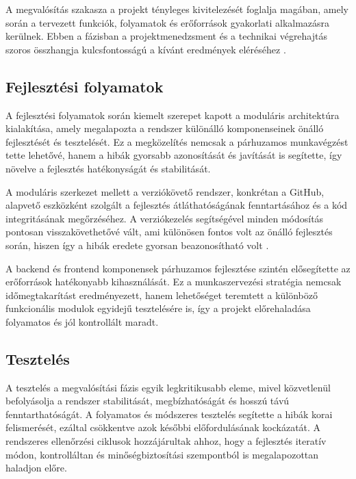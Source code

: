 A megvalósítás szakasza a projekt tényleges kivitelezését foglalja magában, amely során a tervezett funkciók, 
folyamatok és erőforrások gyakorlati alkalmazásra kerülnek. Ebben a fázisban a projektmenedzsment 
és a technikai végrehajtás szoros összhangja kulcsfontosságú a kívánt eredmények eléréséhez \cite{Hajdu2014,Szalay2018,Kaposi2019}.

\subsection{Fejlesztési folyamatok}

A fejlesztési folyamatok során kiemelt szerepet kapott a moduláris architektúra kialakítása, amely megalapozta a rendszer különálló komponenseinek önálló fejlesztését és tesztelését.  
Ez a megközelítés nemcsak a párhuzamos munkavégzést tette lehetővé, hanem a hibák gyorsabb azonosítását és javítását is segítette, így növelve a fejlesztés hatékonyságát és stabilitását.  

A moduláris szerkezet mellett a verziókövető rendszer, konkrétan a GitHub, alapvető eszközként szolgált a fejlesztés átláthatóságának 
fenntartásához és a kód integritásának megőrzéséhez.  
A verziókezelés segítségével minden módosítás pontosan visszakövethetővé vált, ami különösen fontos volt az önálló fejlesztés során, 
hiszen így a hibák eredete gyorsan beazonosítható volt \cite{Kovacs2016,Kaposi2019}.  

A backend és frontend komponensek párhuzamos fejlesztése szintén elősegítette az erőforrások hatékonyabb kihasználását.  
Ez a munkaszervezési stratégia nemcsak időmegtakarítást eredményezett, hanem lehetőséget teremtett a különböző funkcionális modulok 
egyidejű tesztelésére is, így a projekt előrehaladása folyamatos és jól kontrollált maradt.

\subsection{Tesztelés}

A tesztelés a megvalósítási fázis egyik legkritikusabb eleme, mivel közvetlenül befolyásolja a rendszer stabilitását, megbízhatóságát és hosszú távú fenntarthatóságát.  
A folyamatos és módszeres tesztelés segítette a hibák korai felismerését, ezáltal csökkentve azok későbbi előfordulásának kockázatát.  
A rendszeres ellenőrzési ciklusok hozzájárultak ahhoz, hogy a fejlesztés iteratív módon, kontrolláltan és minőségbiztosítási szempontból is megalapozottan haladjon előre.  

